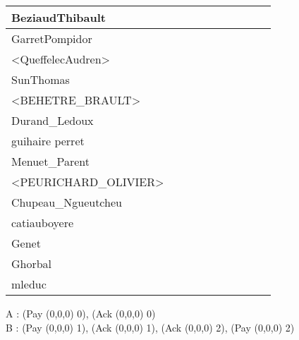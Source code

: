\documentclass[a4paper]{article}
\begin{document}
\begin{table}[h!]
\begin{tabular}{|l|c|c|c|c|c|c|c|c|c|}
    BeziaudThibault         &       &       &       &       &       &       &       &       &       \\ \hline
    GarretPompidor          &       &       &       &       &       &       &       &       &       \\ \hline
    <QueffelecAudren>       &       &       &       &       &       &       &       &       &       \\ \hline
    SunThomas               &       &       &       &       &       &       &       &       &       \\ \hline
    <BEHETRE\_BRAULT>       &       &       &       &       &       &       &       &       &       \\ \hline
    Durand\_Ledoux          &       &       &       &       &       &       &       &       &       \\ \hline
    guihaire perret         &       &       &       &       &       &       &       &       &       \\ \hline
    Menuet\_Parent          &       &       &       &       &       &       &       &       &       \\ \hline
    <PEURICHARD\_OLIVIER>   &       &       &       &       &       &       &       &       &       \\ \hline
    Chupeau\_Ngueutcheu     &       &       &       &       &       &       &       &       &       \\ \hline
    catiauboyere            &       &       &       &       &       &       &       &       &       \\ \hline
    Genet                   &       &       &       &       &       &       &       &       &       \\ \hline
    Ghorbal                 &       &       &       &       &       &       &       &       &       \\ \hline
    mleduc                  &       &       &       &       &       &       &       &       &       \\ \hline
\end{tabular}
\end{table}


\newpage
\noindent
A :  (Pay (0,0,0) 0), (Ack (0,0,0) 0) \\
B :  (Pay (0,0,0) 1), (Ack (0,0,0) 1), (Ack (0,0,0) 2), (Pay (0,0,0) 2)
\end{document}
